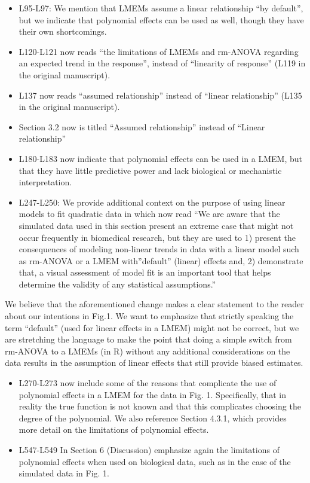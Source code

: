 \documentclass[
]{article}
\begin{document}
\begin{itemize}
\item
  L95-L97: We mention that LMEMs assume a linear relationship ``by default'', but we indicate that polynomial effects can be used as well, though they have their own shortcomings.
\item
  L120-L121 now reads ``the limitations of LMEMs and rm-ANOVA regarding an expected trend in the response'', instead of ``linearity of response'' (L119 in the original manuscript).
\item
  L137 now reads ``assumed relationship'' instead of ``linear relationship'' (L135 in the original manuscript).
\item
  Section 3.2 now is titled ``Assumed relationship'' instead of ``Linear relationship''
\item
  L180-L183 now indicate that polynomial effects can be used in a LMEM, but that they have little predictive power and lack biological or mechanistic interpretation.
\item
  L247-L250: We provide additional context on the purpose of using linear models to fit quadratic data in which now read ``We are aware that the simulated data used in this section present an extreme case that might not occur frequently in biomedical research, but they are used to 1) present the consequences of modeling non-linear trends in data with a linear model such as rm-ANOVA or a LMEM with''default'' (linear) effects and, 2) demonstrate that, a visual assessment of model fit is an important tool that helps determine the validity of any statistical assumptions.''
\end{itemize}

We believe that the aforementioned change makes a clear statement to the reader about our intentions in Fig.1. We want to emphasize that strictly speaking the term ``default'' (used for linear effects in a LMEM) might not be correct, but we are stretching the language to make the point that doing a simple switch from rm-ANOVA to a LMEMs (in R) without any additional considerations on the data results in the assumption of linear effects that still provide biased estimates.

\begin{itemize}
\item
  L270-L273 now include some of the reasons that complicate the use of polynomial effects in a LMEM for the data in Fig. 1. Specifically, that in reality the true function is not known and that this complicates choosing the degree of the polynomial. We also reference Section 4.3.1, which provides more detail on the limitations of polynomial effects.
\item
  L547-L549 In Section 6 (Discussion) emphasize again the limitations of polynomial effects when used on biological data, such as in the case of the simulated data in Fig. 1.
\end{itemize}
\end{document}
